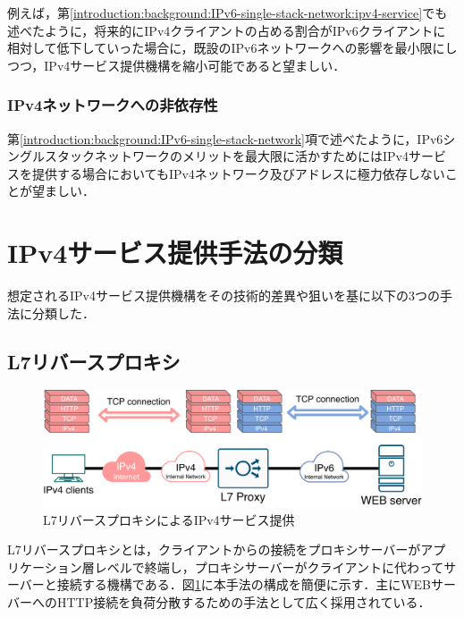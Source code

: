 例えば，第\ref{introduction:background:IPv6-single-stack-network:ipv4-service}でも述べたように，将来的にIPv4クライアントの占める割合がIPv6クライアントに相対して低下していった場合に，既設のIPv6ネットワークへの影響を最小限にしつつ，IPv4サービス提供機構を縮小可能であると望ましい．


\subsubsection{IPv4ネットワークへの非依存性}
第\ref{introduction:background:IPv6-single-stack-network}項で述べたように，IPv6シングルスタックネットワークのメリットを最大限に活かすためにはIPv4サービスを提供する場合においてもIPv4ネットワーク及びアドレスに極力依存しないことが望ましい．



\section{IPv4サービス提供手法の分類}
想定されるIPv4サービス提供機構をその技術的差異や狙いを基に以下の3つの手法に分類した．

\subsection{L7リバースプロキシ}

\begin{figure}[h]
    \begin{center}
      \includegraphics[width=15cm,pagebox=cropbox,clip]{img/L7_proxy_model.pdf}
    \end{center}
    \caption{L7リバースプロキシによるIPv4サービス提供}
    \label{fig:L7_proxy_model}
\end{figure}


L7リバースプロキシとは，クライアントからの接続をプロキシサーバーがアプリケーション層レベルで終端し，プロキシサーバーがクライアントに代わってサーバーと接続する機構である\cite{Gilly2011}．図\ref{fig:L7_proxy_model}に本手法の構成を簡便に示す．主にWEBサーバーへのHTTP接続を負荷分散するための手法として広く採用されている．

